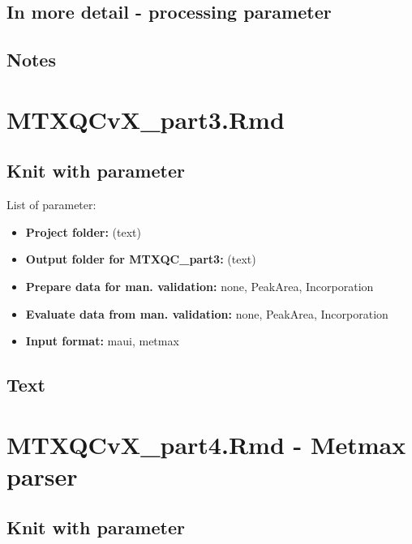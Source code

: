 \documentclass[]{book}
\providecommand{\tightlist}{%
  \setlength{\itemsep}{0pt}\setlength{\parskip}{0pt}}
\begin{document}
\hypertarget{in-more-detail---processing-parameter}{%
\section{In more detail - processing parameter}\label{in-more-detail---processing-parameter}}

\hypertarget{notes}{%
\section{Notes}\label{notes}}

\hypertarget{part3}{%
\chapter{MTXQCvX\_part3.Rmd}\label{part3}}

\hypertarget{knit-with-parameter-4}{%
\section{Knit with parameter}\label{knit-with-parameter-4}}

List of parameter:

\begin{itemize}
\tightlist
\item
  \textbf{Project folder:} (text)
\item
  \textbf{Output folder for MTXQC\_part3:} (text)
\item
  \textbf{Prepare data for man. validation:} none, PeakArea, Incorporation
\item
  \textbf{Evaluate data from man. validation:} none, PeakArea, Incorporation
\item
  \textbf{Input format:} maui, metmax
\end{itemize}

\hypertarget{text-2}{%
\section{Text}\label{text-2}}

\hypertarget{Metmax}{%
\chapter{MTXQCvX\_part4.Rmd - Metmax parser}\label{Metmax}}

\hypertarget{knit-with-parameter-5}{%
\section{Knit with parameter}\label{knit-with-parameter-5}}
\end{document}
